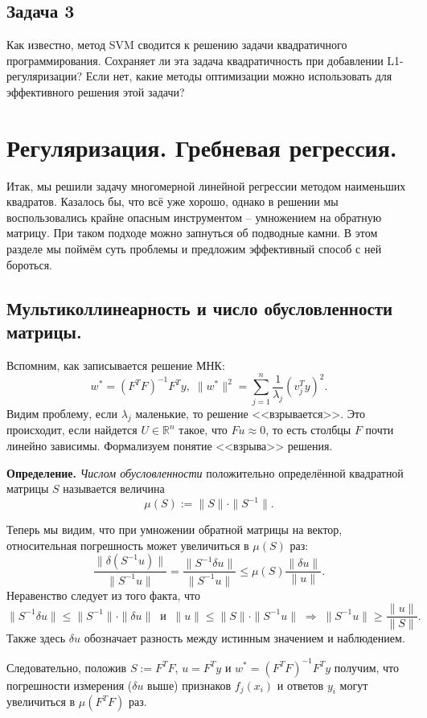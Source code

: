 \subsection*{Задача 3}
Как известно, метод SVM сводится к решению задачи квадратичного программирования. Сохраняет ли эта задача квадратичность при добавлении L1-регуляризации? Если нет, какие методы оптимизации можно использовать для эффективного решения этой задачи?

\section*{Регуляризация. Гребневая регрессия.}

Итак, мы решили задачу многомерной линейной регрессии методом наименьших квадратов. Казалось бы, что всё уже хорошо, однако в решении мы воспользовались крайне опасным инструментом -- умножением на обратную матрицу. При таком подходе можно запнуться об подводные камни. В этом разделе мы поймём суть проблемы и предложим эффективный способ с ней бороться.

\subsection*{Мультиколлинеарность и число обусловленности матрицы.}
Вспомним, как записывается решение МНК:
$$w^* = (F^T F)^{-1} F^T y, \; \|w^*\|^2 = \sum_{j=1}^n \frac{1}{\lambda_j}(v_j^T y)^2.$$
Видим проблему, если $\lambda_j$ маленькие, то решение <<взрывается>>. Это происходит, если найдется $U \in \mathbb{R}^n$ такое, что $Fu \approx 0$, то есть столбцы $F$ почти линейно зависимы. Формализуем понятие <<взрыва>> решения.

\noindent\textbf{Определение.} \textit{Числом обусловленности} 
положительно определённой квадратной матрицы $S$ называется величина
$$\mu(S) := \|S\| \cdot \|S^{-1}\|.$$

Теперь мы видим, что при умножении обратной матрицы на вектор, относительная погрешность может увеличиться в $\mu(S)$ раз:
$$\frac{\|\delta(S^{-1}u)\|}{\|S^{-1}u\|} = \frac{\|S^{-1} \delta u\|}{\|S^{-1}u\|} \leqslant \mu(S)\frac{\|\delta u\|}{\|u\|}.$$
Неравенство следует из того факта, что
$$\|S^{-1}\delta u\| \leqslant \|S^{-1}\| \cdot \|\delta u\| \;\; \text{и} \;\; \|u\| \leqslant \|S\| \cdot \|S^{-1}u\| \; \Rightarrow \; \|S^{-1}u\| \geqslant \frac{\|u\|}{\|S\|}.$$
Также здесь $\delta u$ обозначает разность между истинным значением и наблюдением.

Следовательно, положив $S := F^T F$, $u = F^T y$ и $w^* = (F^T F)^{-1} F^T y$ получим, что погрешности измерения ($\delta u$ выше) признаков $f_j(x_i)$ и ответов $y_i$ могут увеличиться в $\mu(F^T F)$ раз.

